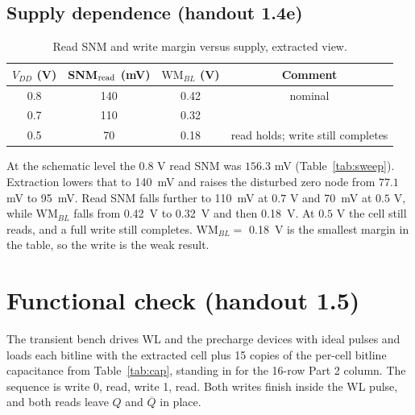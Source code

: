 \documentclass[10pt,letterpaper]{article}
\newcommand{\snmReadPL}{140}        %
\newcommand{\vZeroPL}{95}           %
\newcommand{\wmBL}{0.42}            %
\newcommand{\snmReadSeven}{110}\newcommand{\wmSeven}{0.32}
\newcommand{\snmReadFive}{70}\newcommand{\wmFive}{0.18}
\newcommand{\worksAtFive}{read holds; write still completes}
\begin{document}
\subsection{Supply dependence (handout 1.4e)}
\begin{table}[H]\centering
\caption{Read SNM and write margin versus supply, extracted view.}\label{tab:supply}
\begin{tabular}{@{}cccc@{}}\toprule
$V_{DD}$ (V) & SNM$_{\rm read}$ (mV) & $\mathrm{WM}_{BL}$ (V) & Comment \\\midrule
0.8 & \snmReadPL & \wmBL & nominal \\
0.7 & \snmReadSeven & \wmSeven & \\
0.5 & \snmReadFive & \wmFive & \worksAtFive \\\bottomrule
\end{tabular}
\end{table}
At the schematic level the $0.8$ V read SNM was $156.3$ mV (Table~\ref{tab:sweep}). Extraction lowers that to \snmReadPL\ mV and raises the disturbed zero node from $77.1$ mV to \vZeroPL\ mV. Read SNM falls further to \snmReadSeven\ mV at $0.7$ V and \snmReadFive\ mV at $0.5$ V, while $\mathrm{WM}_{BL}$ falls from \wmBL\ V to \wmSeven\ V and then \wmFive\ V. At $0.5$ V the cell still reads, and a full write still completes. $\mathrm{WM}_{BL}=$ \wmFive\ V is the smallest margin in the table, so the write is the weak result.

\section{Functional check (handout 1.5)}\label{sec:functional}
The transient bench drives WL and the precharge devices with ideal pulses and loads each bitline with the extracted cell plus 15 copies of the per-cell bitline capacitance from Table~\ref{tab:cap}, standing in for the 16-row Part 2 column. The sequence is write 0, read, write 1, read. Both writes finish inside the WL pulse, and both reads leave $Q$ and $\overline Q$ in place.
\end{document}
